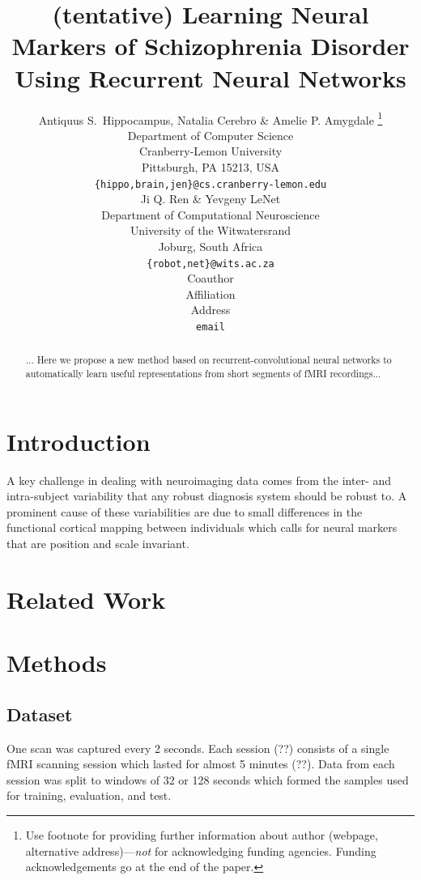\documentclass{article} %
\title{(tentative) Learning Neural Markers of Schizophrenia Disorder Using Recurrent Neural Networks}
\author{Antiquus S.~Hippocampus, Natalia Cerebro \& Amelie P. Amygdale \thanks{ Use footnote for providing further information
about author (webpage, alternative address)---\emph{not} for acknowledging
funding agencies.  Funding acknowledgements go at the end of the paper.} \\
Department of Computer Science\\
Cranberry-Lemon University\\
Pittsburgh, PA 15213, USA \\
\texttt{\{hippo,brain,jen\}@cs.cranberry-lemon.edu} \\
\And
Ji Q. Ren \& Yevgeny LeNet \\
Department of Computational Neuroscience \\
University of the Witwatersrand \\
Joburg, South Africa \\
\texttt{\{robot,net\}@wits.ac.za} \\
\AND
Coauthor \\
Affiliation \\
Address \\
\texttt{email}
}
\begin{document}
\maketitle


\begin{abstract}
... Here we propose a new method based on recurrent-convolutional neural networks to automatically learn useful representations from short segments of fMRI recordings...
\end{abstract}

\section{Introduction}
A key challenge in dealing with neuroimaging data comes from the inter- and intra-subject variability that any robust diagnosis system should be robust to. A prominent cause of these variabilities are due to small differences in the functional cortical mapping between individuals which calls for neural markers that are position and scale invariant.

\section{Related Work}



\section{Methods}

\subsection{Dataset}
One scan was captured every 2 seconds. Each session (??) consists of a single fMRI scanning session which lasted for almost 5 minutes (??). Data from each session was split to windows of 32 or 128 seconds which formed the samples used for training, evaluation, and test.  
\end{document}
